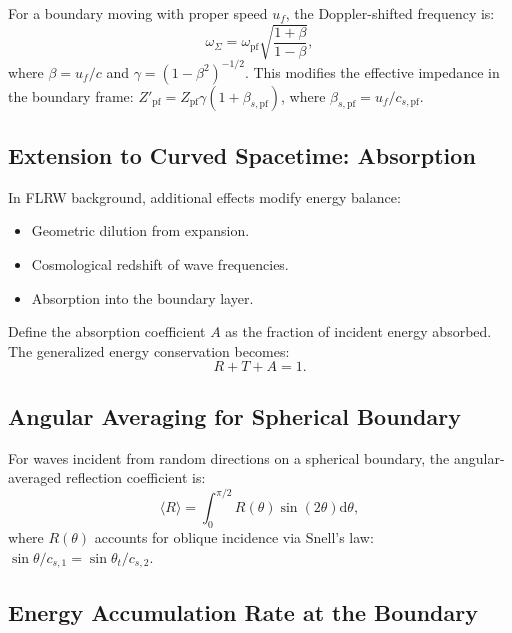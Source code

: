 \documentclass[11pt,a4paper]{article}
\newcommand{\dx}{\mathrm{d}}
\theoremstyle{definition}
\begin{document}
For a boundary moving with proper speed $u_f$, the Doppler-shifted frequency is:
\begin{equation}
\omega_\Sigma = \omega_{\mathrm{pf}} \sqrt{\frac{1 + \beta}{1 - \beta}},
\end{equation}
where $\beta = u_f/c$ and $\gamma = (1-\beta^2)^{-1/2}$. This modifies the effective impedance in the boundary frame: $Z'_{\mathrm{pf}} = Z_{\mathrm{pf}} \gamma (1 + \beta_{s,\mathrm{pf}})$, where $\beta_{s,\mathrm{pf}} = u_f/c_{s,\mathrm{pf}}$.

\subsection{Extension to Curved Spacetime: Absorption}
\label{app:curved_spacetime}

In FLRW background, additional effects modify energy balance:
\begin{itemize}[leftmargin=1.8em]
  \item Geometric dilution from expansion.
  \item Cosmological redshift of wave frequencies.
  \item Absorption into the boundary layer.
\end{itemize}

Define the absorption coefficient $A$ as the fraction of incident energy absorbed. The generalized energy conservation becomes:
\begin{equation}
\boxed{R + T + A = 1.}
\end{equation}

\subsection{Angular Averaging for Spherical Boundary}
\label{app:angular_averaging}

For waves incident from random directions on a spherical boundary, the angular-averaged reflection coefficient is:
\begin{equation}
\langle R \rangle = \int_0^{\pi/2} R(\theta) \sin(2\theta) \dx\theta,
\end{equation}
where $R(\theta)$ accounts for oblique incidence via Snell's law: $\sin\theta/c_{s,1} = \sin\theta_t/c_{s,2}$.

\subsection{Energy Accumulation Rate at the Boundary}
\label{app:energy_accumulation}
\end{document}
